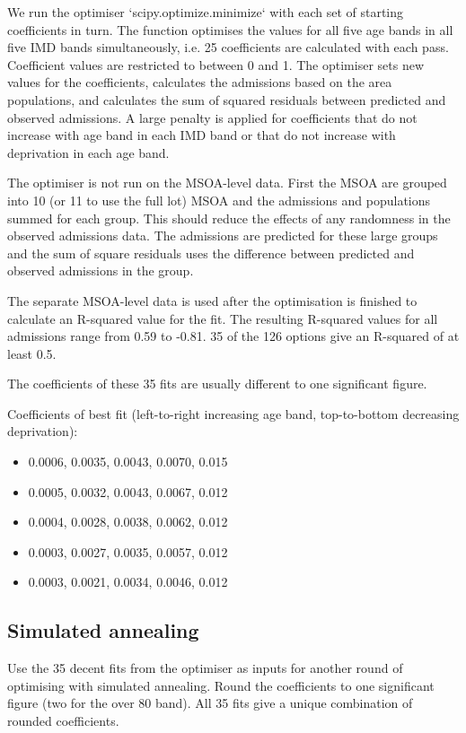 \documentclass[12pt]{extarticle}
\begin{document}
We run the optimiser `scipy.optimize.minimize` with each set of starting coefficients in turn. The function optimises the values for all five age bands in all five IMD bands simultaneously, i.e. 25 coefficients are calculated with each pass. Coefficient values are restricted to between 0 and 1. The optimiser sets new values for the coefficients, calculates the admissions based on the area populations, and calculates the sum of squared residuals between predicted and observed admissions. A large penalty is applied for coefficients that do not increase with age band in each IMD band or that do not increase with deprivation in each age band.

The optimiser is not run on the MSOA-level data. First the MSOA are grouped into 10 (or 11 to use the full lot) MSOA and the admissions and populations summed for each group. This should reduce the effects of any randomness in the observed admissions data.
The admissions are predicted for these large groups and the sum of square residuals uses the difference between predicted and observed admissions in the group.

The separate MSOA-level data is used after the optimisation is finished to calculate an R-squared value for the fit. The resulting R-squared values for all admissions range from 0.59 to -0.81. 35 of the 126 options give an R-squared of at least 0.5. 

The coefficients of these 35 fits are usually different to one significant figure. 

Coefficients of best fit (left-to-right increasing age band, top-to-bottom decreasing deprivation):
\begin{itemize}
    \item 0.0006, 0.0035, 0.0043, 0.0070, 0.015
    \item 0.0005, 0.0032, 0.0043, 0.0067, 0.012
    \item 0.0004, 0.0028, 0.0038, 0.0062, 0.012
    \item 0.0003, 0.0027, 0.0035, 0.0057, 0.012
    \item 0.0003, 0.0021, 0.0034, 0.0046, 0.012
\end{itemize}

\subsection{Simulated annealing}

Use the 35 decent fits from the optimiser as inputs for another round of optimising with simulated annealing.
Round the coefficients to one significant figure (two for the over 80 band).
All 35 fits give a unique combination of rounded coefficients.
\end{document}
